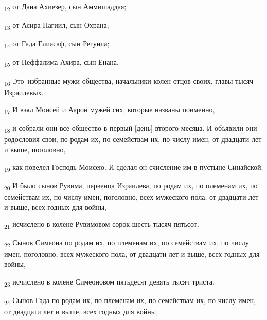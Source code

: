 \begin{tcolorbox}
\textsubscript{12} от Дана Ахиезер, сын Аммишаддая;
\end{tcolorbox}
\begin{tcolorbox}
\textsubscript{13} от Асира Пагиил, сын Охрана;
\end{tcolorbox}
\begin{tcolorbox}
\textsubscript{14} от Гада Елиасаф, сын Регуила;
\end{tcolorbox}
\begin{tcolorbox}
\textsubscript{15} от Неффалима Ахира, сын Енана.
\end{tcolorbox}
\begin{tcolorbox}
\textsubscript{16} Это--избранные мужи общества, начальники колен отцов своих, главы тысяч Израилевых.
\end{tcolorbox}
\begin{tcolorbox}
\textsubscript{17} И взял Моисей и Аарон мужей сих, которые названы поименно,
\end{tcolorbox}
\begin{tcolorbox}
\textsubscript{18} и собрали они все общество в первый [день] второго месяца. И объявили они родословия свои, по родам их, по семействам их, по числу имен, от двадцати лет и выше, поголовно,
\end{tcolorbox}
\begin{tcolorbox}
\textsubscript{19} как повелел Господь Моисею. И сделал он счисление им в пустыне Синайской.
\end{tcolorbox}
\begin{tcolorbox}
\textsubscript{20} И было сынов Рувима, первенца Израилева, по родам их, по племенам их, по семействам их, по числу имен, поголовно, всех мужеского пола, от двадцати лет и выше, всех годных для войны,
\end{tcolorbox}
\begin{tcolorbox}
\textsubscript{21} исчислено в колене Рувимовом сорок шесть тысяч пятьсот.
\end{tcolorbox}
\begin{tcolorbox}
\textsubscript{22} Сынов Симеона по родам их, по племенам их, по семействам их, по числу имен, поголовно, всех мужеского пола, от двадцати лет и выше, всех годных для войны,
\end{tcolorbox}
\begin{tcolorbox}
\textsubscript{23} исчислено в колене Симеоновом пятьдесят девять тысяч триста.
\end{tcolorbox}
\begin{tcolorbox}
\textsubscript{24} Сынов Гада по родам их, по племенам их, по семействам их, по числу имен, от двадцати лет и выше, всех годных для войны,
\end{tcolorbox}
